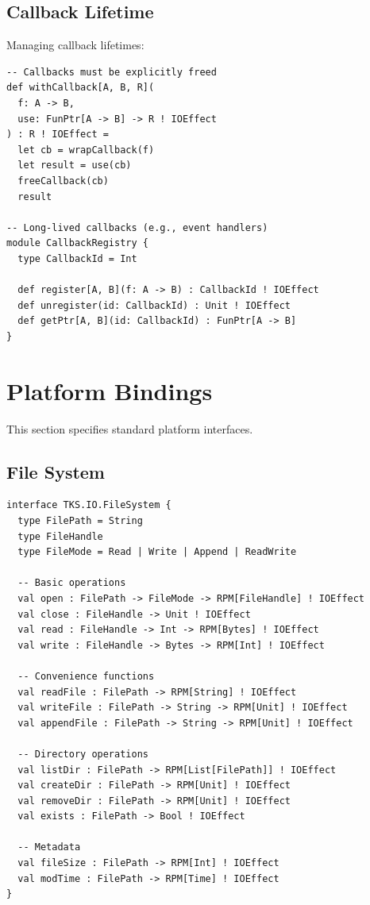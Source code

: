 \subsection{Callback Lifetime}
\label{subsec:callback-lifetime}

\begin{definition}
\label{def:callback-registration}
Managing callback lifetimes:
\begin{verbatim}
-- Callbacks must be explicitly freed
def withCallback[A, B, R](
  f: A -> B,
  use: FunPtr[A -> B] -> R ! IOEffect
) : R ! IOEffect =
  let cb = wrapCallback(f)
  let result = use(cb)
  freeCallback(cb)
  result

-- Long-lived callbacks (e.g., event handlers)
module CallbackRegistry {
  type CallbackId = Int

  def register[A, B](f: A -> B) : CallbackId ! IOEffect
  def unregister(id: CallbackId) : Unit ! IOEffect
  def getPtr[A, B](id: CallbackId) : FunPtr[A -> B]
}
\end{verbatim}
\end{definition}

\section{Platform Bindings}
\label{sec:platform-bindings}

This section specifies standard platform interfaces.

\subsection{File System}
\label{subsec:filesystem}

\begin{definition}
\label{def:filesystem-interface}
\begin{verbatim}
interface TKS.IO.FileSystem {
  type FilePath = String
  type FileHandle
  type FileMode = Read | Write | Append | ReadWrite

  -- Basic operations
  val open : FilePath -> FileMode -> RPM[FileHandle] ! IOEffect
  val close : FileHandle -> Unit ! IOEffect
  val read : FileHandle -> Int -> RPM[Bytes] ! IOEffect
  val write : FileHandle -> Bytes -> RPM[Int] ! IOEffect

  -- Convenience functions
  val readFile : FilePath -> RPM[String] ! IOEffect
  val writeFile : FilePath -> String -> RPM[Unit] ! IOEffect
  val appendFile : FilePath -> String -> RPM[Unit] ! IOEffect

  -- Directory operations
  val listDir : FilePath -> RPM[List[FilePath]] ! IOEffect
  val createDir : FilePath -> RPM[Unit] ! IOEffect
  val removeDir : FilePath -> RPM[Unit] ! IOEffect
  val exists : FilePath -> Bool ! IOEffect

  -- Metadata
  val fileSize : FilePath -> RPM[Int] ! IOEffect
  val modTime : FilePath -> RPM[Time] ! IOEffect
}
\end{verbatim}
\end{definition}

